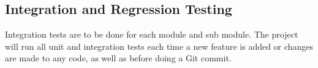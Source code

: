 \subsection{Integration and Regression Testing}

Integration tests are to be done for each module and sub module.
The project will run all unit and integration tests each time a new feature is added or changes are made to any code, as well as before doing a Git commit.



